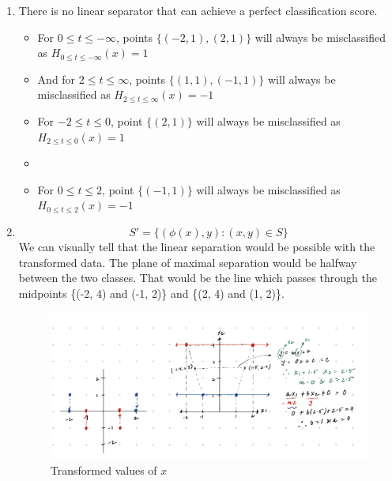 \begin{enumerate}
    
    \item 
        There is no linear separator that can achieve a perfect classification score.
        
        \begin{itemize}
            \item For $0 \leq t \leq -\infty$, points $\{ (-2, 1), (2, 1) \}$ will always be misclassified as $H_{0 \leq t \leq -\infty}(x) = 1$
            \item And for $2 \leq t \leq \infty$, points $\{ (1, 1), (-1, 1) \}$ will always be misclassified as $H_{2 \leq t \leq \infty}(x) = -1$
            \item For $-2 \leq t \leq 0$, point $\{(2, 1) \}$ will always be misclassified as $H_{2 \leq t \leq 0}(x) = 1$
            \item \item For $0 \leq t \leq 2$, point $\{(-1, 1) \}$ will always be misclassified as $H_{0 \leq t \leq 2}(x) = -1$ 
        \end{itemize}
    
    \item
        $$S' = \{ (\phi(x), y): (x, y) \in S \}$$ 
        We can visually tell that the linear separation would be possible with the transformed data. The plane of maximal separation would be halfway between the two classes. That would be the line which passes through the midpoints \{(-2, 4) and (-1, 2)\} and \{(2, 4) and (1, 2)\}. 
        
        \begin{figure}[!ht]
            \centering
            \includegraphics[width=\textwidth]{images/problem_2}
            \caption{Transformed values of $x$}
        \end{figure}
        

\end{enumerate}
